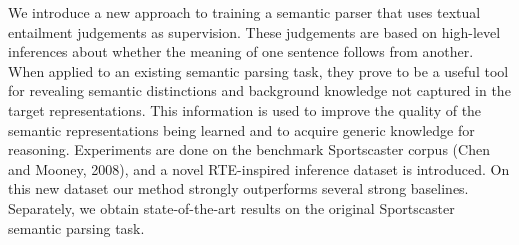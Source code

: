 We introduce a new approach to training a semantic parser that uses textual entailment judgements as supervision. These judgements are based on high-level inferences about whether the meaning of one sentence follows from another. When applied to an existing semantic parsing task, they prove to be a useful tool for revealing semantic distinctions and background knowledge not captured in the target representations. This information is used to improve the quality of the semantic representations being learned and to acquire generic knowledge for reasoning. Experiments are done on the benchmark Sportscaster corpus (Chen and Mooney, 2008), and a novel RTE-inspired inference dataset is introduced. On this new dataset our method strongly outperforms several strong baselines. Separately, we obtain state-of-the-art results on the original Sportscaster semantic parsing task.
